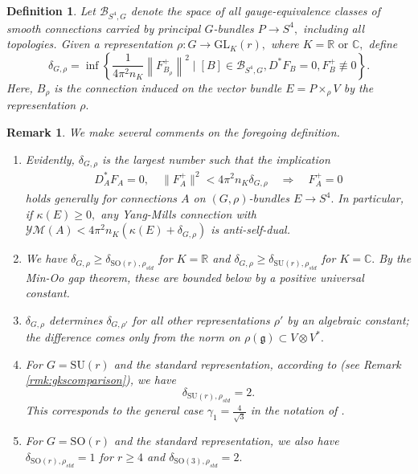 \documentclass[12pt]{amsart}
\newcommand{\YM}{\mathcal{YM}}
\newcommand{\LB}{\left[}
\newcommand{\RB}{\right]}
\newcommand{\C}{{\mathbb C}}
\renewcommand{\1}{{\mathbf 1}}
\newcommand{\R}{{\mathbb R}}
\newcommand{\calB}{\mathcal{B}}
\newcommand{\SU}{{\mathrm{SU} }}
\newcommand{\SO}{{\mathrm{SO} }}
\newcommand{\GL}{{\mathrm{GL} }}
\newcommand{\gothg}{{\mathfrak g}}
\theoremstyle{others}
\newtheorem{rmk}[thm]{Remark}
\newtheorem{defn}[thm]{Definition}
\numberwithin{equation}{section}
\begin{document}
\begin{defn}\label{defn:delta} Let $\calB_{S^4,G}$ denote the space of all gauge-equivalence classes of smooth connections carried by principal $G$-bundles $P \to S^4,$ including all topologies. %
Given a representation $\rho: G \to \GL_K(r),$ where $K = \R \text{ or } \C,$ define
\begin{equation*}
\delta_{G, \rho} = \inf \left\{ \frac{1}{4 \pi^2 n_{K}} \left\| F^+_{B_\rho} \right\|^2 \mid \LB B \RB \in \calB_{S^4,G}, D^*F_B = 0, F^+_B \not\equiv 0 \right\}.
\end{equation*}
Here, $B_\rho$ is the connection induced on the vector bundle $E = P \times_\rho V$ by the representation $\rho.$
\end{defn}
\begin{rmk}\label{rmk:deltaGrho} We make several comments on the foregoing definition.
\begin{enumerate}[itemsep=2mm]

\item Evidently, $\delta_{G, \rho}$ is the largest number such that the implication
\begin{equation*}%
\begin{split}
D_A^* F_A = 0, \quad \|F^+_A\|^2 < 4 \pi^2 n_K \delta_{G, \rho} %
\quad \Rightarrow \quad F^+_A = 0
\end{split}
\end{equation*}
holds generally for connections $A$ on $(G, \rho)$-bundles $E \to S^4.$ In particular, if $\kappa(E) \geq 0,$ any Yang-Mills connection with
$ \YM(A) < 4 \pi^2 n_{K} \left( \kappa(E) + \delta_{G, \rho} \right) $ is anti-self-dual.


\item We have $\delta_{G, \rho} \geq \delta_{\SO(r), \rho_{std}}$ for $K = \R$ and $\delta_{G, \rho} \geq \delta_{\SU(r), \rho_{std}}$ for $K = \C.$ %
By the Min-Oo gap theorem, %
these are bounded below by a positive universal constant.

\item $\delta_{G, \rho}$ determines $\delta_{G, \rho'}$ for all other representations $\rho'$ by an algebraic constant; the difference comes only from the norm on $\rho(\gothg) \subset V \otimes V^*.$

\item
For $G = \SU(r)$ and the standard representation, according to \cite[Corollary 1.2]{gurskykelleherstreets} (see Remark \ref{rmk:gkscomparison}), we have
$$\delta_{\SU(r), \rho_{std}} = 2.$$
This corresponds to the general case $\gamma_1 = \frac{4}{\sqrt{3}}$ in the notation of \cite{gurskykelleherstreets}.

\item For $G = \SO(r)$ and the standard representation, we also have
$\delta_{\SO(r), \rho_{std}} = 1$ for $r \geq 4$ and $\delta_{\SO(3), \rho_{std}} = 2.$

\end{enumerate}
\end{rmk} 
\end{document}

